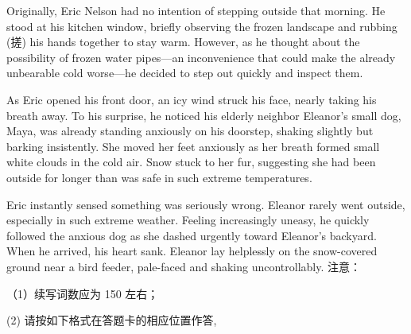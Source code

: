 \documentclass{英语试卷}
\begin{document}
\par Originally, Eric Nelson had no intention of stepping outside that morning. He stood at his kitchen window, briefly observing the frozen landscape and rubbing (搓) his hands together to stay warm. However, as he thought about the possibility of frozen water pipes—an inconvenience that could make the already unbearable cold worse—he decided to step out quickly and inspect them.\par
\par As Eric opened his front door, an icy wind struck his face, nearly taking his breath away. To his surprise, he noticed his elderly neighbor Eleanor's small dog, Maya, was already standing anxiously on his doorstep, shaking slightly but barking insistently. She moved her feet anxiously as her breath formed small white clouds in the cold air. Snow stuck to her fur, suggesting she had been outside for longer than was safe in such extreme temperatures.\par
\par Eric instantly sensed something was seriously wrong. Eleanor rarely went outside, especially in such extreme weather. Feeling increasingly uneasy, he quickly followed the anxious dog as she dashed urgently toward Eleanor's backyard. When he arrived, his heart sank. Eleanor lay helplessly on the snow-covered ground near a bird feeder, pale-faced and shaking uncontrollably. 注意：\par
\par （1）续写词数应为 150 左右；\par
\par (2) 请按如下格式在答题卡的相应位置作答,\par
{}
\end{document}
